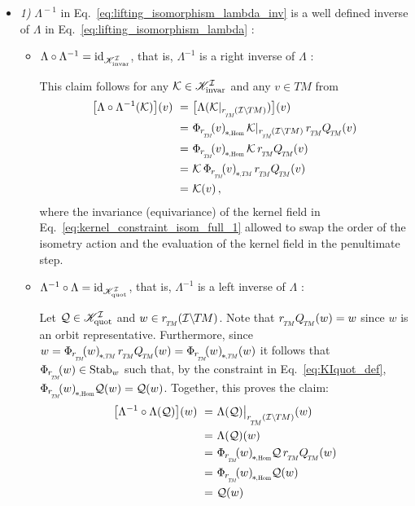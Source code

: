 \begin{itemize}[leftmargin=0cm]

    \item[] {\textit{1)} $\Lambda^{\!-1}$ in Eq.~\eqref{eq:lifting_isomorphism_lambda_inv} is a well defined inverse of $\Lambda$ in Eq.~\eqref{eq:lifting_isomorphism_lambda} : }

    \begin{itemize}[leftmargin=1.1cm]
    \setlength\itemsep{2ex}

        \item[\it 1\hspace{1pt}a)]
            $\Lambda \circ \Lambda^{-1} = \mathrm{id}_{\mathscr{K}_\textup{invar}^{\mathcal{I}}}$,
            that is, $\Lambda^{-1}$ is a right inverse of $\Lambda$ :

            This claim follows for any $\mathcal{K}\in \mathscr{K}_\textup{invar}^{\mathcal{I}}$ and any $v \in TM$ from
            \begin{align}
                \big[\Lambda \circ \Lambda^{-1} (\K) \big](v)
                \ =&\ \big[ \Lambda(\Krestr) \big](v) \notag \\
                \ =&\ \dPhirHom{v} \, \Krestr     \, \rTM \QTM (v) \notag \\
                \ =&\ \dPhirHom{v} \, \K          \, \rTM \QTM (v) \notag \\
                \ =&\ \K           \, \dPhirTM{v} \, \rTM \QTM (v) \notag \\
                \ =&\ \K(v) \,,
            \end{align}
            where the invariance (equivariance) of the kernel field in Eq.~\eqref{eq:kernel_constraint_isom_full_1} allowed to swap the order of the isometry action and the evaluation of the kernel field in the penultimate step.

        \item[\it 1\hspace{1pt}b)]
            $\Lambda^{-1} \circ \Lambda = \mathrm{id}_{\mathscr{K}_\textup{quot}^{\mathcal{I}}}$,
            that is, $\Lambda^{-1}$ is a left inverse of $\Lambda$ :

            Let $\mathcal{Q}\in \mathscr{K}_\textup{quot}^{\mathcal{I}}$ and $w \in \rTM(\ITM)$.
            Note that $\rTM\QTM(w) = w$ since $w$ is an orbit representative.
            Furthermore, since $w = \dPhirTM{w}\, \rTM\QTM(w) = \dPhirTM{w} (w)$ it follows that $\Phir{w} \in \Stab{w}$ such that, by the constraint in Eq.~\eqref{eq:KIquot_def}, $\dPhirHom{w} \Q(w) = \Q(w)$.
            Together, this proves the claim:
            \begin{align}
                \big[\Lambda^{-1} \circ \Lambda (\Q) \big](w)
                \ =&\ \Lambda(\Q) \big|_{\rTM(\ITM)}(w) \notag \\
                \ =&\ \Lambda(\Q)(w) \notag \\
                \ =&\ \dPhirHom{w} \Q\, \rTM \QTM(w) \notag \\
                \ =&\ \dPhirHom{w} \Q(w) \notag \\
                \ =&\ \Q(w)
            \end{align}


\end{itemize}
\end{itemize}

